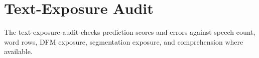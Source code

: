 \section{Text-Exposure Audit}
The text-exposure audit checks prediction scores and errors against speech count, word rows, DFM exposure, segmentation exposure, and comprehension where available.
